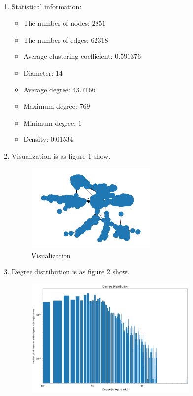 \documentclass[12pt]{article}
\newcommand {\bsolution}{\noindent {\em Solution:} \ }
\begin{document}
\bsolution
\begin{enumerate}[label=(\alph*)]
	\item Statistical information:
	\begin{itemize}
		\item The number of nodes: $2851$
		\item The number of edges: $62318$
		\item Average clustering coefficient: $0.591376$
		\item Diameter: $14$
		\item Average degree: $43.7166$
		\item Maximum degree: $769$
		\item Minimum degree: $1$
		\item Density: $0.01534$
	\end{itemize}
	\item Visualization is as figure 1 show.
	\begin{figure}[h]
		\centering
		\includegraphics[width=0.6\textwidth]{visualize.png}
		\caption{Visualization}
		\label{visualize}
	\end{figure}
	\item Degree distribution is as figure 2 show.
	\begin{figure}[h]
		\centering
		\includegraphics[width=0.8\textwidth]{degree dist.png}

\end{figure}
\end{enumerate}
\end{document}
